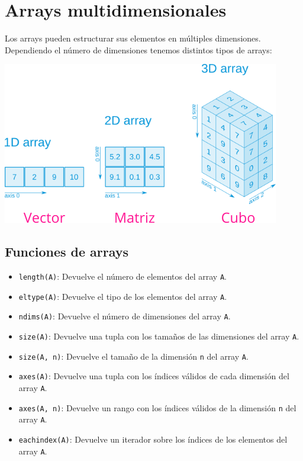 \documentclass[
  letterpaper,
  DIV=11,
  numbers=noendperiod]{scrreprt}
\providecommand{\tightlist}{%
  \setlength{\itemsep}{0pt}\setlength{\parskip}{0pt}}\usepackage{longtable,booktabs,array}
\begin{document}
\hypertarget{arrays-multidimensionales}{%
\section{Arrays multidimensionales}\label{arrays-multidimensionales}}

Los arrays pueden estructurar sus elementos en múltiples dimensiones.
Dependiendo el número de dimensiones tenemos distintos tipos de arrays:

\includegraphics{./img/arrays.png}

\hypertarget{funciones-de-arrays}{%
\subsection{Funciones de arrays}\label{funciones-de-arrays}}

\begin{itemize}
\tightlist
\item
  \texttt{length(A)}: Devuelve el número de elementos del array
  \texttt{A}.
\item
  \texttt{eltype(A)}: Devuelve el tipo de los elementos del array
  \texttt{A}.
\item
  \texttt{ndims(A)}: Devuelve el número de dimensiones del array
  \texttt{A}.
\item
  \texttt{size(A)}: Devuelve una tupla con los tamaños de las
  dimensiones del array \texttt{A}.
\item
  \texttt{size(A,\ n)}: Devuelve el tamaño de la dimensión \texttt{n}
  del array \texttt{A}.
\item
  \texttt{axes(A)}: Devuelve una tupla con los índices válidos de cada
  dimensión del array \texttt{A}.
\item
  \texttt{axes(A,\ n)}: Devuelve un rango con los índices válidos de la
  dimensión \texttt{n} del array \texttt{A}.
\item
  \texttt{eachindex(A)}: Devuelve un iterador sobre los índices de los
  elementos del array \texttt{A}.
\end{itemize}
\end{document}
